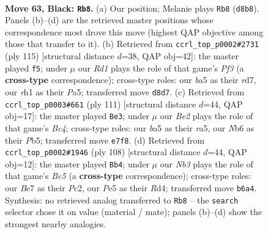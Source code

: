 \documentclass[11pt]{article}
\begin{document}
\clearpage

\begin{figure}[p]\centering
\begin{subfigure}{0.46\textwidth}\centering
\resizebox{\linewidth}{!}{%
\newchessgame
\chessboard[
  setfen={3r4/4b3/pn1p2kp/B3p3/4P2p/5P1B/5K2/7R b - - 3 63},
  showmover=false,
  pgfstyle=straightmove, color=movearrow, markmove={d8-b8}
]}
\caption{}
\end{subfigure}\hfill
\begin{subfigure}{0.46\textwidth}\centering
\resizebox{\linewidth}{!}{%
\newchessgame
\chessboard[
  setfen={8/3Rn1k1/1p3pp1/p1b4p/P6P/3B2P1/6K1/8 b - - 6 58},
  showmover=false,
  pgfstyle=straightmove, color=movearrow, markmove={f6-f5}
]}
\caption{}
\end{subfigure}
\\[4pt]
\begin{subfigure}{0.46\textwidth}\centering
\resizebox{\linewidth}{!}{%
\newchessgame
\chessboard[
  setfen={6k1/7p/6p1/Rpb5/p5P1/p1P4P/5r2/B2KN3 b - - 5 56},
  showmover=false,
  pgfstyle=straightmove, color=movearrow, markmove={c5-e3}
]}
\caption{}
\end{subfigure}\hfill
\begin{subfigure}{0.46\textwidth}\centering
\resizebox{\linewidth}{!}{%
\newchessgame
\chessboard[
  setfen={4b3/6pk/8/r1B2p1p/3R1P1P/4P3/PKP5/8 w - - 5 55},
  showmover=false,
  pgfstyle=straightmove, color=movearrow, markmove={c5-b4}
]}
\caption{}
\end{subfigure}
\caption{\textbf{Move 63, Black: \texttt{Rb8}.} (a) Our position; Melanie plays \texttt{Rb8} (\texttt{d8b8}). Panels (b)--(d) are the retrieved master positions whose correspondence most drove this move (highest QAP objective among those that transfer to it). (b) Retrieved from \texttt{ccrl\_top\_p0002\#2731} (ply 115) [structural distance $d$=38, QAP obj=42]: the master played \texttt{f5}; under $\mu$ our \emph{Rd1} plays the role of that game's \emph{Pf3} (a \textbf{cross-type} correspondence); cross-type roles: our \emph{b}a5 as their \emph{r}d7, our \emph{r}h1 as their \emph{P}a5; transferred move \texttt{d8d7}. (c) Retrieved from \texttt{ccrl\_top\_p0003\#661} (ply 111) [structural distance $d$=44, QAP obj=17]: the master played \texttt{Be3}; under $\mu$ our \emph{Be2} plays the role of that game's \emph{Bc4}; cross-type roles: our \emph{b}a5 as their \emph{r}a5, our \emph{N}b6 as their \emph{P}b5; transferred move \texttt{e7f8}. (d) Retrieved from \texttt{ccrl\_top\_p0002\#1946} (ply 108) [structural distance $d$=44, QAP obj=12]: the master played \texttt{Bb4}; under $\mu$ our \emph{Nb3} plays the role of that game's \emph{Bc5} (a \textbf{cross-type} correspondence); cross-type roles: our \emph{B}e7 as their \emph{P}c2, our \emph{P}e5 as their \emph{R}d4; transferred move \texttt{b6a4}. Synthesis: no retrieved analog transferred to \texttt{Rb8} -- the \texttt{search} selector chose it on value (material / mate); panels (b)--(d) show the strongest nearby analogies.}
\label{fig:thought-m125}
\end{figure}
\end{document}
